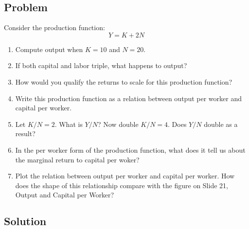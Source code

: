 \documentclass[12pt]{article}
\begin{document}
\subsection{Problem}
Consider the production function:
\[
Y = K + 2N
\]
\begin{enumerate}[label=(\alph*)]
    \item Compute output when \(K = 10\) and \(N = 20\).
    \item If both capital and labor triple, what happens to output?
    \item How would you qualify the returns to scale for this production function?
    \item Write this production function as a relation between output per worker and capital per worker.
    \item Let \(K/N = 2\). What is \(Y /N\)? Now double \(K/N = 4\). Does \(Y /N\) double as a result?
    \item In the per worker form of the production function, what does it tell us about the marginal return to capital per woker?
    \item Plot the relation between output per worker and capital per worker. How does the shape of this relationship compare with the figure on Slide 21, Output and Capital per Worker?
\end{enumerate}

\subsection{Solution}
\end{document}
